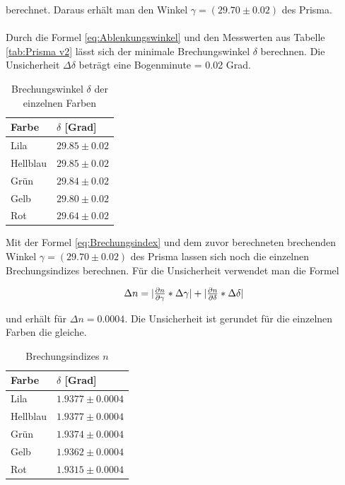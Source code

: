 \documentclass[12pt,a4paper,twoside]{article}
\begin{document}
\noindent
berechnet. Daraus erhält man den Winkel $\gamma = (29.70 \pm 0.02)$ des Prisma. 
\\
\\
Durch die Formel \ref{eq:Ablenkungswinkel} und den Messwerten aus Tabelle \ref{tab:Prisma v2} lässt sich der minimale Brechungswinkel $\delta$ berechnen. 
Die Unsicherheit $\Delta \delta$ beträgt eine Bogenminute = 0.02 Grad. 

\begin{table}[H]
    \centering
    \caption{Brechungswinkel $\delta$ der einzelnen Farben}
    \label{tab:delta scheiß}
    \begin{tabular}{| l | l |}
        \hline
        Farbe & $\delta$ [Grad] \\
        \hline
        Lila        & $ 29.85 \pm 0.02 $ \\
        Hellblau    & $ 29.85 \pm 0.02 $ \\
        Grün        & $ 29.84 \pm 0.02 $ \\
        Gelb        & $ 29.80 \pm 0.02 $ \\
        Rot         & $ 29.64 \pm 0.02 $ \\
        \hline
    \end{tabular}
\end{table}

\noindent
Mit der Formel \ref{eq:Brechungsindex} und dem zuvor berechneten brechenden Winkel $\gamma = (29.70 \pm 0.02)$ des Prisma lassen sich noch die einzelnen Brechungsindizes berechnen. 
Für die Unsicherheit verwendet man die Formel

\begin{equation}
    \label{eq:uns n}
    \centerline{$ \Delta n = \vert \frac{\partial n}{\partial \gamma} * \Delta \gamma \vert + \vert \frac{\partial n }{\partial \delta} * \Delta \delta \vert$}
\end{equation}

\noindent
und erhält für $\Delta n = 0.0004$. Die Unsicherheit ist gerundet für die einzelnen Farben die gleiche. 

\begin{table}[H]
    \centering
    \caption{Brechungsindizes $n$}
    \label{tab:delta n}
    \begin{tabular}{| l | l |}
        \hline
        Farbe & $\delta$ [Grad] \\
        \hline
        Lila        & $ 1.9377 \pm 0.0004 $ \\
        Hellblau    & $ 1.9377 \pm 0.0004 $ \\
        Grün        & $ 1.9374 \pm 0.0004 $ \\
        Gelb        & $ 1.9362 \pm 0.0004 $ \\
        Rot         & $ 1.9315 \pm 0.0004 $ \\
        \hline
    \end{tabular}
\end{table}
\end{document}
